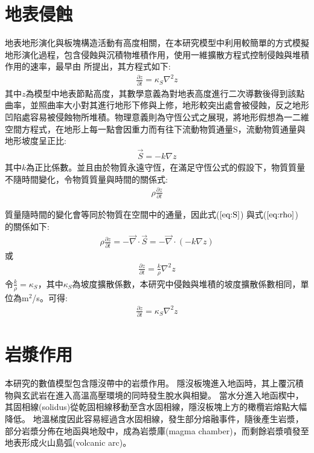 \section{地表侵蝕}
地表地形演化與板塊構造活動有高度相關，在本研究模型中利用較簡單的方式模擬地形演化過程，包含侵蝕與沉積物堆積作用，使用一維擴散方程式控制侵蝕與堆積作用的速率，最早由\citet{culling1960analytical} 所提出，其方程式如下:
\begin{align}
\frac{\partial z}{\partial t} = \kappa_S \nabla^2 z \label{eq:erosion}
\end{align}
其中$z$為模型中地表節點高度，其數學意義為對地表高度進行二次導數後得到該點曲率，並照曲率大小對其進行地形下修與上修，地形較突出處會被侵蝕，反之地形凹陷處容易被侵蝕物所堆積。物理意義則為守恆公式之展現，將地形假想為一二維空間方程式，在地形上每一點會因重力而有往下流動物質通量S，流動物質通量與地形坡度呈正比:
\begin{align}
\vec S = -k\nabla z \label{eq:S}
\end{align}
其中$k$為正比係數。並且由於物質永遠守恆，在滿足守恆公式的假設下，物質質量不隨時間變化，令物質質量與時間的關係式:
\begin{align}
\rho\frac{\partial z}{\partial t}\label{eq:rho}
\end{align}

質量隨時間的變化會等同於物質在空間中的通量，因此式($\ref{eq:S}$) 與式($\ref{eq:rho}$) 的關係如下:
\begin{align}
\rho\frac{\partial z}{\partial t} = -\vec\nabla\cdot \vec S = -\vec\nabla \cdot (-k\nabla z)\label{eq:erosion2}
\end{align}
或
\begin{align}
\frac{\partial z}{\partial t} = \frac{k}{\rho}\nabla^2 z\label{eq:erosion3}
\end{align}
令$\frac{k}{\rho}=\kappa_S$，其中$\kappa_S$為坡度擴散係數，本研究中侵蝕與堆積的坡度擴散係數相同，單位為m${^2}$/s。可得:
\begin{align}
\frac{\partial z}{\partial t} = \kappa_S\nabla^2 z\label{eq:erosion4}
\end{align}

\section{岩漿作用}\label{岩漿作用}
本研究的數值模型包含隱沒帶中的岩漿作用。
隱沒板塊進入地函時，其上覆沉積物與玄武岩在進入高溫高壓環境的同時發生脫水與相變。
當水分進入地函楔中，其固相線(solidus)從乾固相線移動至含水固相線，隱沒板塊上方的橄欖岩熔點大幅降低。
地溫梯度因此容易經過含水固相線，發生部分熔融事件，隨後產生岩漿，部分岩漿分佈在地函與地殼中，成為岩漿庫(magma chamber)，而剩餘岩漿噴發至地表形成火山島弧(volcanic arc)。

